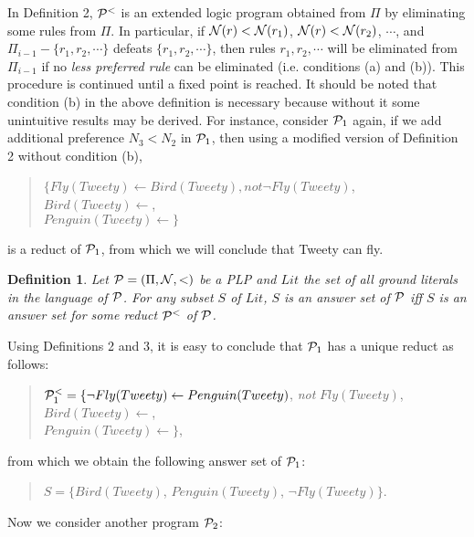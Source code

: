 \documentclass{tlp}
\newtheorem{definition}{Definition} %
\begin{document}
In Definition 2,
${\cal P}^{<}$ is an extended logic program
obtained from
$\Pi$ by eliminating some rules from $\Pi$.  In particular,
if ${\cal N}(r)<{\cal N}(r_{1})$, ${\cal N}(r)<{\cal N}(r_{2})$,
$\cdots$,
and $\Pi_{i-1}-\{r_{1}, r_{2},\cdots\}$ defeats $\{r_{1}, r_{2},\cdots\}$, then rules
$r_{1},r_{2},\cdots$
will be eliminated from $\Pi_{i-1}$ if no {\em less preferred rule} can be
eliminated (i.e. conditions (a) and (b)).
This procedure is continued until a fixed point is reached.
It should be noted that condition (b) in the above definition is 
necessary because without it some unintuitive 
results may be derived. For instance, consider ${\cal P}_{1}$ again,
if we add additional preference $N_3<N_2$ in ${\cal P}_{1}$, then using
a modified version of Definition 2 without condition (b), 
\begin{quote}
$\{Fly(Tweety)\leftarrow Bird(Tweety), not \neg Fly(Tweety)$, \\
\hspace*{.2in} $Bird(Tweety)\leftarrow$,\\
\hspace*{.2in} $Penguin(Tweety)\leftarrow\}$
\end{quote} 
is a reduct of ${\cal P}_1$, from which we will 
conclude that Tweety can fly.

\begin{definition}
\cite{yan:plp}
Let ${\cal P}=(\Pi,{\cal N},<)$ be a PLP and $Lit$ the set of all
ground literals in the language of $\cal P$. For any subset $S$ of $Lit$, $S$
is an {\em answer set} of $\cal P$ iff
$S$ is an answer set for some reduct ${\cal P}^{<}$ of ${\cal P}$.
\end{definition}

Using Definitions 2 and 3, it is easy to conclude that ${\cal P}_{1}$
has a unique reduct as follows:
\begin{quote}
${\cal P}_{1}^{<}=\{\neg Fly(Tweety)\leftarrow Penguin(Tweety)$, 
{\em not} $Fly(Tweety)$,\\
\hspace*{.5in} $Bird(Tweety)\leftarrow$, \\
\hspace*{.5in} $Penguin(Tweety)\leftarrow\}$,
\end{quote}
from which we obtain the following answer set of ${\cal P}_{1}$:
\begin{quote}
$S=\{Bird(Tweety)$, $Penguin(Tweety)$, $\neg Fly(Tweety)\}$.
\end{quote}

Now we consider another program ${\cal P}_{2}$:
\end{document}
